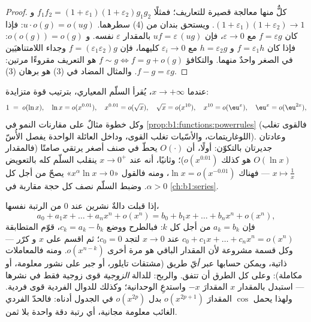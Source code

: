 \begin{proof}
كلٌّ منها معالجة قصيرة للتعاريف؛ فمثلًا
$f_1 f_2 = (1+\varepsilon_1)(1+\varepsilon_2) g_1 g_2$ و $(1 +
\varepsilon_1)(1+\varepsilon_2) \to 1$. ويستحق بندان من (4)
سطرهما. $u\cdot o(g) = o(ug)$: فإذا كان $f = \varepsilon g$ مع
$\varepsilon \to 0$، فإن $uf = \varepsilon\,(ug)$ بالمقدار
$\varepsilon$ نفسه. و $o(o(g)) = o(g)$: فإذا كان $f = \varepsilon_1 h$ و
$h = \varepsilon_2 g$ مع $\varepsilon_i \to 0$ كليهما، فإن $f =
(\varepsilon_1\varepsilon_2) g$ وجداء اللامتناهيَين في
الصغر واحدٌ منهما. والتكافؤ $f \sim g \iff f = g +
o(g)$ هو التعريف مقروءًا مرتين: $f - g = \varepsilon g$.
والمثال المضاد في (3) هو برهان (3).
\end{proof}

\begin{example}[سلّم المقارنة]\label{ex:b1:taylor:scale}
عندما $x \to +\infty$، يُقرأ السلّم المعياري، بترتيب
قوة متزايدة:
\[
1 \;=\; o(\ln x), \quad
\ln x = o(x^{0.01}), \quad
x^{0.01} = o(\sqrt x), \quad
\sqrt x = o(x^{10}), \quad
x^{10} = o(\eu^{x}), \quad
\eu^x = o(\eu^{2x}) ,
\]
وكل خطوة مثالٌ على مقارنات النمو في
\cref{prop:b1:functions:powerrules} (فالقوى تغلب اللوغاريتمات،
والأسّيات تغلب القوى، وداخل العائلة الواحدة يفصل
الأُسّ). وعادتان جديرتان بالتكوّن: أولًا، أن $O(\cdot)$ يحطّ
في صنف أصغر يرتقي صامتًا (فالمقدار $O(\ln x)$ هو كذلك
$o(x^{0.01})$)؛ وثانيًا، أنه عند $x \to 0^+$ ينقلب السلّم كله
بالتعويض $x \mapsto \frac1x$ ---
فهناك $\ln x = o(x^{-0.01})$، ومنه فالقول «$x^\alpha \ln x \to 0$»
يصحّ من أجل كل $\alpha > 0$. وضبط السلّم
نصف كل حجة مقاربة في
\cref{ch:b1:series}.
\end{example}

\begin{example}\label{ex:b1:taylor:uniqueness}
إذا قبلت دالةٌ نشرين عند $0$ من الرتبة نفسها،
\[
a_0 + a_1 x + \dots + a_n x^n + o(x^n)
= b_0 + b_1 x + \dots + b_n x^n + o(x^n),
\]
فإن $a_k = b_k$ من أجل كل $k$: فبالطرح ووضع $c_k =
a_k - b_k$، قوّم المتطابقة $c_0 + c_1 x + \dots + c_n x^n
= o(x^n)$ عند $x \to 0$ لتجد $c_0 = 0$؛ ثم اقسم على $x$ و
كرّر --- وكل قسمة مشروعة لأن المقدار الباقي
هو مرة أخرى $o(x^{n-k})$. ومنه فالمعاملات ذاتية،
ويمكن حسابها عبر \emph{أيّ} طريق (مشتقات تايلور،
أو جبر على نشور معلومة، أو مكاملة): وعلى كل
الطرق أن تتفق. والربح: للدالة \emph{الزوجية} قوى
زوجية فقط في نشرها --- استبدل بالمقدار $x$ المقدارَ $-x$ واستدعِ
الوحدانية؛ وكذلك للدوال الفردية قوى فردية. ولهذا
يحمل $\cos$ المقدارَ $o(x^{2p+1})$ بدل $o(x^{2p})$ في
الجدول أدناه: فالحدّ الفردي الغائب معلومة مجانية، أي رتبة
دقة واحدة بلا ثمن.
\end{example}

